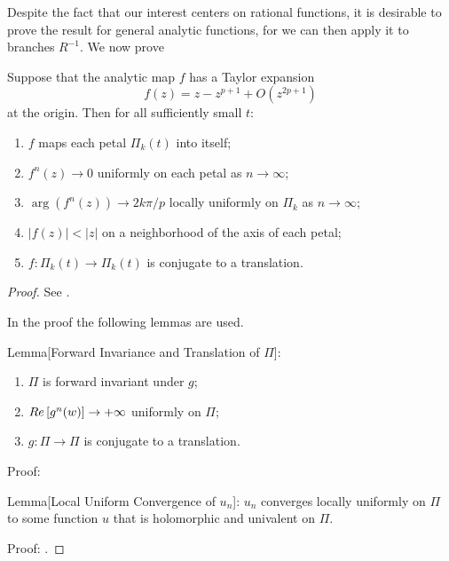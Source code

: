 Despite the fact that our interest centers on rational functions, it is
desirable to prove the result for general analytic functions, for we can then
apply it to branches $R^{-1}$. We now prove

\begin{theorem}
    \label{thm:the_petal_theorem}
    Suppose that the analytic map $f$ has a Taylor expansion
    \begin{equation}
        \label{eq:taylor_expansion_for_the_petal_theorem}
        f(z) = z - z^{p+1} + O(z^{2p+1})
    \end{equation}
    at the origin. Then for all sufficiently small $t$:
    \begin{enumerate}[label=(\roman*)]
        \item \label{itm:petal_forward_invariance} $f$ maps each petal
        $\Pi_k(t)$ into itself;
        \item \label{itm:iterates_converge_to_zero_uniformly} $f^n(z) \to 0$
        uniformly on each petal as $n \to \infty$;
        \item \label{itm:iterates_convergence_to_zero_along_petal_axis}
        $\arg(f^n(z)) \to 2k\pi/p$ locally uniformly on $\Pi_k$ as $n \to
        \infty$;
        \item \label{itm:attracting_behavior_on_the_petals_axis} $|f(z)| < |z|$
        on a neighborhood of the axis of each petal;
        \item \label{itm:linear_behavior_in_the_petals} $f: \Pi_k(t) \to
        \Pi_k(t)$ is conjugate to a translation.
    \end{enumerate}
\end{theorem}
\begin{proof}
    See \cite[116--122]{Beardon1991}.

    In the proof the following lemmas are used.

    Lemma[Forward Invariance and Translation of $\Pi$]:
    \begin{enumerate}[label=(\roman*)]
        \item $\Pi$ is forward invariant under $g$;
        \item $\mathop{Re}\left[{g^n(w)}\right] \to +\infty$ uniformly on $\Pi$;
        \item $g: \Pi \to \Pi$ is conjugate to a translation.
    \end{enumerate}

    Proof: \cite[118--122]{Beardon1991}

    Lemma[Local Uniform Convergence of $u_n$]: $u_n$ converges locally uniformly
    on $\Pi$ to some function $u$ that is holomorphic and univalent on $\Pi$.
    
    Proof: \cite[122]{Beardon1991}.
\end{proof}

